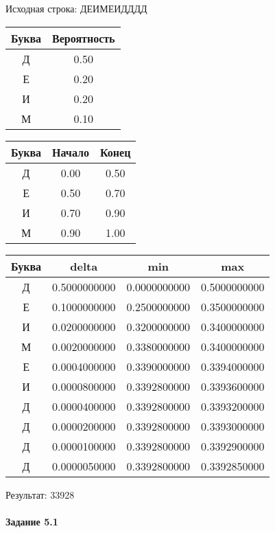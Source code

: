\documentclass[a4paper, 12pt]{article}
\begin{document}
Исходная строка: ДЕИМЕИДДДД\
\begin{center}
 \begin{tabular}{ |c|c| } 
  \hline
     Буква & Вероятность \\ \hline
Д & 0.50\\\hline
Е & 0.20\\\hline
И & 0.20\\\hline
М & 0.10
\\ \hline \end{tabular}
\end{center}
\begin{center}
 \begin{tabular}{ |c|c|c| } 
  \hline
     Буква & Начало & Конец \\ \hline
Д & 0.00 & 0.50\\\hline
Е & 0.50 & 0.70\\\hline
И & 0.70 & 0.90\\\hline
М & 0.90 & 1.00
\\ \hline \end{tabular}
\end{center}
\begin{center}
 \begin{tabular}{ |c|c|c|c| } 
  \hline
     Буква & delta & min & max \\ \hline
Д & 0.5000000000 & 0.0000000000 & 0.5000000000\\\hline
Е & 0.1000000000 & 0.2500000000 & 0.3500000000\\\hline
И & 0.0200000000 & 0.3200000000 & 0.3400000000\\\hline
М & 0.0020000000 & 0.3380000000 & 0.3400000000\\\hline
Е & 0.0004000000 & 0.3390000000 & 0.3394000000\\\hline
И & 0.0000800000 & 0.3392800000 & 0.3393600000\\\hline
Д & 0.0000400000 & 0.3392800000 & 0.3393200000\\\hline
Д & 0.0000200000 & 0.3392800000 & 0.3393000000\\\hline
Д & 0.0000100000 & 0.3392800000 & 0.3392900000\\\hline
Д & 0.0000050000 & 0.3392800000 & 0.3392850000
\\ \hline \end{tabular}
\end{center}
Результат: 33928
\pagebreak
\paragraph{Задание 5.1 \\
}
\end{document}

